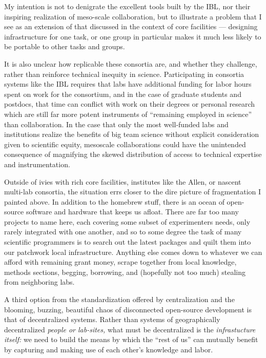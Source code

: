 \documentclass[nohyper]{tufte-book-jls}
\begin{document}
My intention is not to denigrate the excellent tools built by the IBL,
nor their inspiring realization of meso-scale collaboration, but to
illustrate a problem that I see as an extension of that discussed in the
context of core facilities --- designing infrastructure for one task, or
one group in particular makes it much less likely to be portable to
other tasks and groups.

It is also unclear how replicable these consortia are, and whether they
challenge, rather than reinforce technical inequity in science.
Participating in consortia systems like the IBL requires that labs have
additional funding for labor hours spent on work for the consortium, and
in the case of graduate students and postdocs, that time can conflict
with work on their degrees or personal research which are still far more
potent instruments of ``remaining employed in science'' than
collaboration. In the case that only the most well-funded labs and
institutions realize the benefits of big team science without explicit
consideration given to scientific equity, mesoscale collaborations could
have the unintended consequence of magnifying the skewed distribution of
access to technical expertise and instrumentation.

Outside of ivies with rich core facilities, institutes like the Allen,
or nascent multi-lab consortia, the situation errs closer to the dire
picture of fragmentation I painted above. In addition to the homebrew
stuff, there is an ocean of open-source software and hardware that keeps
us afloat. There are far too many projects to name here, each covering some subset of
experimenters needs, only rarely integrated with one another, and so to
some degree the task of many scientific programmers is to search out the
latest packages and quilt them into our patchwork local infrastructure.
Anything else comes down to whatever we can afford with remaining grant
money, scrape together from local knowledge, methods sections, begging,
borrowing, and (hopefully not too much) stealing from neighboring labs.

A third option from the standardization offered by centralization and
the blooming, buzzing, beautiful chaos of disconnected open-source
development is that of decentralized systems. Rather than systems of
geographically decentralized \emph{people or lab-sites,} what must be
decentralized is the \emph{infrastucture itself:} we need to build the
means by which the ``rest of us'' can mutually benefit by capturing and
making use of each other's knowledge and labor.
\end{document}
